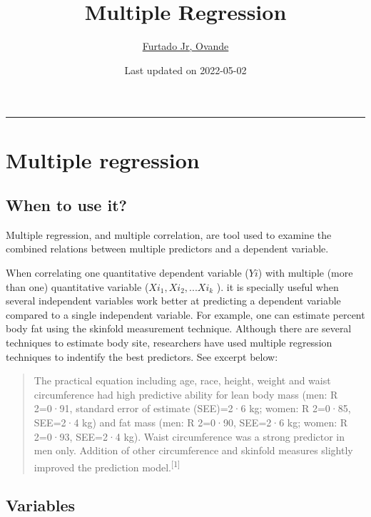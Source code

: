 \documentclass[
]{article}
\title{Multiple Regression}
\author{\href{http://drfurtado.us}{Furtado Jr, Ovande}}
\date{Last updated on 2022-05-02}
\begin{document}
\maketitle

{
\setcounter{tocdepth}{2}
\tableofcontents
}
\begin{center}\rule{0.5\linewidth}{0.5pt}\end{center}

\hypertarget{multiple-regression}{%
\section{Multiple regression}\label{multiple-regression}}

\hypertarget{when-to-use-it}{%
\subsection{When to use it?}\label{when-to-use-it}}

Multiple regression, and multiple correlation, are tool used to examine the combined relations between multiple predictors and a dependent variable.

When correlating one quantitative dependent variable (\(Yi\)) with multiple (more than one) quantitative variable (\(Xi_1, Xi_2,... Xi_k\) ). it is specially useful when several independent variables work better at predicting a dependent variable compared to a single independent variable. For example, one can estimate percent body fat using the skinfold measurement technique. Although there are several techniques to estimate body site, researchers have used multiple regression techniques to indentify the best predictors. See excerpt below:

\begin{quote}
The practical equation including age, race, height, weight and waist circumference had high predictive ability for lean body mass (men: R 2=0·91, standard error of estimate (SEE)=2·6 kg; women: R 2=0·85, SEE=2·4 kg) and fat mass (men: R 2=0·90, SEE=2·6 kg; women: R 2=0·93,
SEE=2·4 kg). Waist circumference was a strong predictor in men only. Addition of other circumference and skinfold measures slightly improved the prediction model.\textsuperscript{{[}1{]}}
\end{quote}

\hypertarget{variables}{%
\subsection{Variables}\label{variables}}
\end{document}

